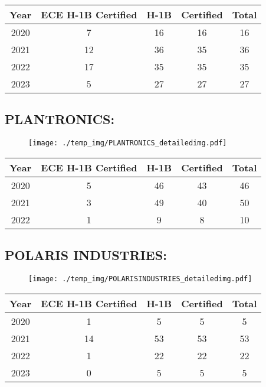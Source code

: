 \documentclass{article}%
\begin{document}
%
\begin{longtable}{c|c|c|c|c}%
\hline%
Year&ECE H{-}1B Certified&H{-}1B&Certified&Total\\%
\hline%
2020&7&16&16&16\\%
\hline%
2021&12&36&35&36\\%
\hline%
2022&17&35&35&35\\%
\hline%
2023&5&27&27&27\\%
\hline%
\end{longtable}

%
\newpage%
\subsection{PLANTRONICS:}%
\label{subsec:PLANTRONICS}%
\label{PLANTRONICSdetailed}%


\begin{figure}[htbp]%
\centering%
\texttt{[image: ./temp\_img/PLANTRONICS\_detailedimg.pdf]}%
\end{figure}

%
\begin{longtable}{c|c|c|c|c}%
\hline%
Year&ECE H{-}1B Certified&H{-}1B&Certified&Total\\%
\hline%
2020&5&46&43&46\\%
\hline%
2021&3&49&40&50\\%
\hline%
2022&1&9&8&10\\%
\hline%
\end{longtable}

%
\newpage%
\subsection{POLARIS INDUSTRIES:}%
\label{subsec:POLARISINDUSTRIES}%
\label{POLARISINDUSTRIESdetailed}%


\begin{figure}[htbp]%
\centering%
\texttt{[image: ./temp\_img/POLARISINDUSTRIES\_detailedimg.pdf]}%
\end{figure}

%
\begin{longtable}{c|c|c|c|c}%
\hline%
Year&ECE H{-}1B Certified&H{-}1B&Certified&Total\\%
\hline%
2020&1&5&5&5\\%
\hline%
2021&14&53&53&53\\%
\hline%
2022&1&22&22&22\\%
\hline%
2023&0&5&5&5\\%
\hline%
\end{longtable}
\end{document}
